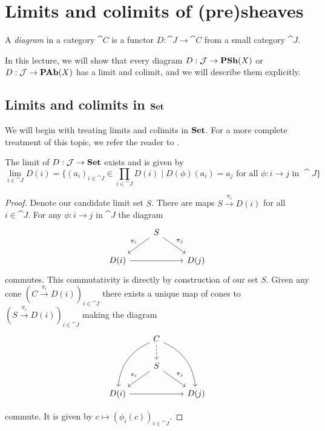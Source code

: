\documentclass[../main.tex]{subfiles}
\begin{document}
\chapter{Limits and colimits of (pre)sheaves}
\begin{defn}
    A \emph{diagram} in a category $\cat C$ is a functor $D: \cat J \to \cat C$ from a small category $\cat J$. 
\end{defn}

In this lecture, we will show that every diagram $D: \mathcal{J} \to \operatorname{\mathbf{PSh}}(X)$ or $D: \mathcal{J} \to \operatorname{\mathbf{PAb}}(X)$ has a limit and colimit, and we will describe them explicitly.

\section{Limits and colimits in $\mathbf{Set}$}

We will begin with treating limits and colimits in $\mathbf{Set}$. For a more complete treatment of this topic, we refer the reader to \cite[Chapter~3.2]{riehlCategoryTheoryContext2016}.
\begin{prop}
    The limit of $D: \mathcal{J} \to \mathbf{Set}$ exists and is given by \[
        \lim_{i\in \cat J}D(i) = \{(a_i)_{i \in \cat J} \in \prod_{i \in \cat J}D(i) \mid D(\phi)(a_i) = a_j \text{ for all } \phi: i \to j \text{ in } \cat J\}
    \]
\end{prop}
\begin{proof}
	Denote our candidate limit set $S$. There are maps $S \xrightarrow{\pi_i} D(i)$ for all $i \in \cat J$. For any $\phi: i \to j$ in $\cat J$ the diagram 
    \[
      \begin{tikzcd}
                & S \arrow[ld, "\pi_i"'] \arrow[rd, "\pi_j"] &      \\
D(i) \arrow[rr] &                                            & D(j)
\end{tikzcd}  
    \]
commutes. This commutativity is directly by construction of our set $S$. Given any cone $(C \xrightarrow{\pi_i} D(i))_{i \in \cat J}$ there exists a unique map of cones to $(S \xrightarrow{\pi_i} D(i))_{i \in \cat J}$ making the diagram 
\[
\begin{tikzcd}
                & C \arrow[ldd, bend right] \arrow[rdd, bend left] \arrow[d, dashed] &      \\
                & S \arrow[ld, "\pi_i"'] \arrow[rd, "\pi_j"]                         &      \\
D(i) \arrow[rr] &                                                                    & D(j)
\end{tikzcd}\]

commute. It is given by $c \mapsto (\phi_i(c))_{i \in \cat J}$.

\end{proof}
\end{document}
